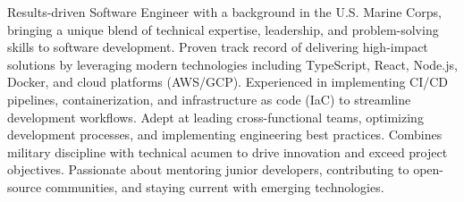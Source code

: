 

\begin{cvparagraph}

Results-driven Software Engineer with a background in the U.S. Marine Corps, bringing a unique blend of technical expertise, leadership, and problem-solving skills to software development. Proven track record of delivering high-impact solutions by leveraging modern technologies including TypeScript, React, Node.js, Docker, and cloud platforms (AWS/GCP). Experienced in implementing CI/CD pipelines, containerization, and infrastructure as code (IaC) to streamline development workflows. Adept at leading cross-functional teams, optimizing development processes, and implementing engineering best practices. Combines military discipline with technical acumen to drive innovation and exceed project objectives. Passionate about mentoring junior developers, contributing to open-source communities, and staying current with emerging technologies.
\end{cvparagraph}
